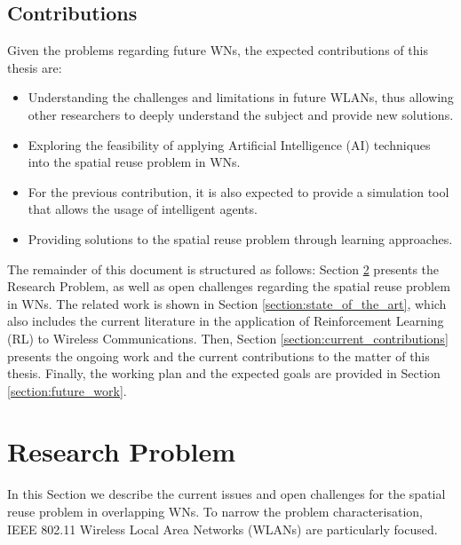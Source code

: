 \documentclass[12pt, a4paper,twoside]{tesi_upf}
\begin{document}
		\section{Contributions}
		\label{section:contributions}
			Given the problems regarding future WNs, the expected contributions of this thesis are:
			\begin{itemize}
				\item Understanding the challenges and limitations in future WLANs, thus allowing other researchers to deeply understand the subject and provide new solutions.
				\item Exploring the feasibility of applying Artificial Intelligence (AI) techniques into the spatial reuse problem in WNs.
				\item For the previous contribution, it is also expected to provide a simulation tool that allows the usage of intelligent agents.
				\item Providing solutions to the spatial reuse problem through learning approaches.
			\end{itemize}		
			
		The remainder of this document is structured as follows: Section \ref{section:research_problem} presents the Research Problem, as well as open challenges regarding the spatial reuse problem in WNs. The related work is shown in Section \ref{section:state_of_the_art}, which also includes the current literature in the application of Reinforcement Learning (RL) to Wireless Communications. Then, Section \ref{section:current_contributions} presents the ongoing work and the current contributions to the matter of this thesis. Finally, the working plan and the expected goals are provided in Section \ref{section:future_work}.

	\chapter{Research Problem}
	\label{section:research_problem}
		In this Section we describe the current issues and open challenges for the spatial reuse problem in overlapping WNs. To narrow the problem characterisation, IEEE 802.11 Wireless Local Area Networks (WLANs) are particularly focused.
		
\end{document}
